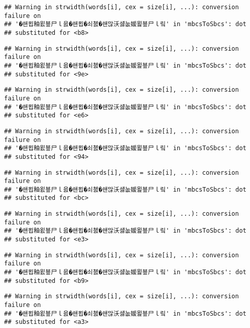 \documentclass[]{article}
\begin{document}
\begin{verbatim}
## Warning in strwidth(words[i], cex = size[i], ...): conversion failure on
## '�쇈묍釉욄뵾尸ｌ읈�쇈묍�쇠쳸�쇈많沃섏눖媛묉뵾尸ｌ맄' in 'mbcsToSbcs': dot
## substituted for <b8>
\end{verbatim}

\begin{verbatim}
## Warning in strwidth(words[i], cex = size[i], ...): conversion failure on
## '�쇈묍釉욄뵾尸ｌ읈�쇈묍�쇠쳸�쇈많沃섏눖媛묉뵾尸ｌ맄' in 'mbcsToSbcs': dot
## substituted for <9e>
\end{verbatim}

\begin{verbatim}
## Warning in strwidth(words[i], cex = size[i], ...): conversion failure on
## '�쇈묍釉욄뵾尸ｌ읈�쇈묍�쇠쳸�쇈많沃섏눖媛묉뵾尸ｌ맄' in 'mbcsToSbcs': dot
## substituted for <e6>
\end{verbatim}

\begin{verbatim}
## Warning in strwidth(words[i], cex = size[i], ...): conversion failure on
## '�쇈묍釉욄뵾尸ｌ읈�쇈묍�쇠쳸�쇈많沃섏눖媛묉뵾尸ｌ맄' in 'mbcsToSbcs': dot
## substituted for <94>
\end{verbatim}

\begin{verbatim}
## Warning in strwidth(words[i], cex = size[i], ...): conversion failure on
## '�쇈묍釉욄뵾尸ｌ읈�쇈묍�쇠쳸�쇈많沃섏눖媛묉뵾尸ｌ맄' in 'mbcsToSbcs': dot
## substituted for <bc>
\end{verbatim}

\begin{verbatim}
## Warning in strwidth(words[i], cex = size[i], ...): conversion failure on
## '�쇈묍釉욄뵾尸ｌ읈�쇈묍�쇠쳸�쇈많沃섏눖媛묉뵾尸ｌ맄' in 'mbcsToSbcs': dot
## substituted for <e3>
\end{verbatim}

\begin{verbatim}
## Warning in strwidth(words[i], cex = size[i], ...): conversion failure on
## '�쇈묍釉욄뵾尸ｌ읈�쇈묍�쇠쳸�쇈많沃섏눖媛묉뵾尸ｌ맄' in 'mbcsToSbcs': dot
## substituted for <b9>
\end{verbatim}

\begin{verbatim}
## Warning in strwidth(words[i], cex = size[i], ...): conversion failure on
## '�쇈묍釉욄뵾尸ｌ읈�쇈묍�쇠쳸�쇈많沃섏눖媛묉뵾尸ｌ맄' in 'mbcsToSbcs': dot
## substituted for <a3>
\end{verbatim}
\end{document}
